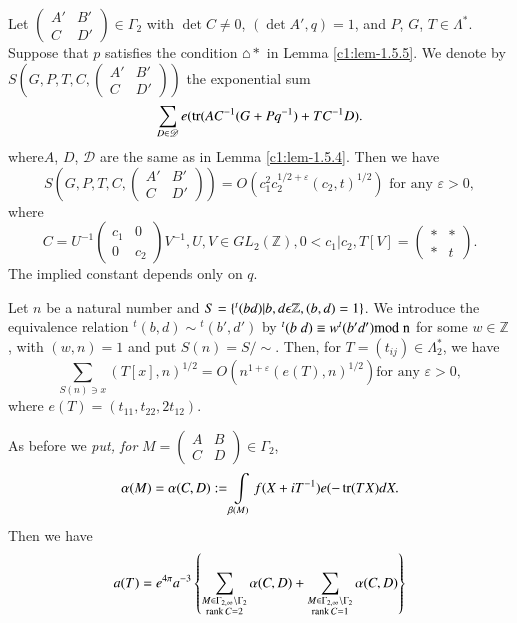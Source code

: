 \setcounter{subprop}{5}
\begin{subprop}\label{c1:prop-1.5.6}
Let $\left(\begin{smallmatrix} A' & B'\\ C & D'
\end{smallmatrix}\right)\in\Gamma_{2}$ with $\det C\neq 0$, $(\det
A',q)=1$, and $P$, $G$, $T\in\Lambda^{\ast}$. Suppose that $p$
satisfies the condition $\house{\ast}$ in Lemma
\ref{c1:lem-1.5.5}. We denote by $S(G,P,T,C,\left(\begin{smallmatrix} A'
  & B'\\ C & D'\end{smallmatrix}\right))$ the exponential sum
$$
\sum_{D\in\mathscr{D}}e(\operatorname{tr}(AC^{-1}(G+Pq^{-1})+TC^{-1}D).
$$
where\pageoriginale $A$, $D$, $\mathscr{D}$ are the same as in Lemma
\ref{c1:lem-1.5.4}. Then we have
$$
S(G,P,T,C,
\begin{pmatrix}
A' & B'\\
C & D'
\end{pmatrix}
)
=O(c^{2}_{1}c^{1/2+\varepsilon}_{2}(c_{2},t)^{1/2})\text{ \ for any
  \ } \varepsilon>0, 
$$
where
$$
C=U^{-1}
\begin{pmatrix}
c_{1} & 0\\
0 & c_{2}
\end{pmatrix}
V^{-1}, U, V\in GL_{2}(\mathbb{Z}), 0<c_{1}|c_{2}, T[V]=
\begin{pmatrix}
\ast &\ast\\
\ast & t
\end{pmatrix}.
$$
The implied constant depends only on $q$.
\end{subprop}

\begin{subprop}\label{c1:prop-1.5.7}
Let $n$ be a natural number and $S=\{{}^{t}(bd)|b,d\epsilon
\mathbb{Z},\break(b,d)=1\}$. We introduce the equivalence relation
${}^{t}(b,d)\sim {}^{t}(b',d')$ by ${}^{t}(b \; d)\equiv w{}^{t}(b'd')\rm{mod} \;
n$ for some $w\in\mathbb{Z}$, with $(w,n)=1$ and put
$S(n)=S/\sim$. Then, for $T=(t_{ij})\in\Lambda^{\ast}_{2}$, we have
$$
\sum_{S(n)\ni x} (T[x],n)^{1/2}=O(n^{1+\varepsilon}(e(T),n)^{1/2})\text{
  \ for  any  \ }\varepsilon >0,
$$
where $e(T)=(t_{11},t_{22},2t_{12})$.
\end{subprop}

As before we {\em put, for} $M=\left(\begin{smallmatrix} A & B\\ C & D
\end{smallmatrix}\right)\in\Gamma_{2}$,
$$
\alpha(M)=\alpha(C,D):=\int\limits_{\beta(M)}f(X+iT^{-1})e(-\operatorname{tr}(TX)dX.
$$
Then we have
$$
a(T)=e^{4\pi}a^{-3}\left\{\sum_{\substack{M\in\Gamma_{2,\infty}\backslash
    \Gamma_{2}\\ \operatorname{rank}
    C=2}}\alpha(C,D)+\sum_{\substack{M\in\Gamma_{2,\infty}\backslash
      \Gamma_{2}\\ \operatorname{rank} C=1}}\alpha(C,D)\right\}
$$

